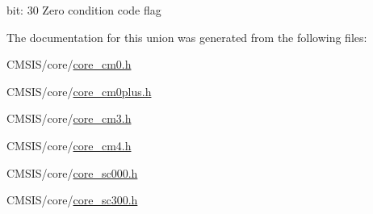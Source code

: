 bit\+: 30 Zero condition code flag 

The documentation for this union was generated from the following files\+:\begin{DoxyCompactItemize}
\item 
C\+M\+S\+I\+S/core/\mbox{\hyperlink{core__cm0_8h}{core\+\_\+cm0.\+h}}\item 
C\+M\+S\+I\+S/core/\mbox{\hyperlink{core__cm0plus_8h}{core\+\_\+cm0plus.\+h}}\item 
C\+M\+S\+I\+S/core/\mbox{\hyperlink{core__cm3_8h}{core\+\_\+cm3.\+h}}\item 
C\+M\+S\+I\+S/core/\mbox{\hyperlink{core__cm4_8h}{core\+\_\+cm4.\+h}}\item 
C\+M\+S\+I\+S/core/\mbox{\hyperlink{core__sc000_8h}{core\+\_\+sc000.\+h}}\item 
C\+M\+S\+I\+S/core/\mbox{\hyperlink{core__sc300_8h}{core\+\_\+sc300.\+h}}\end{DoxyCompactItemize}
